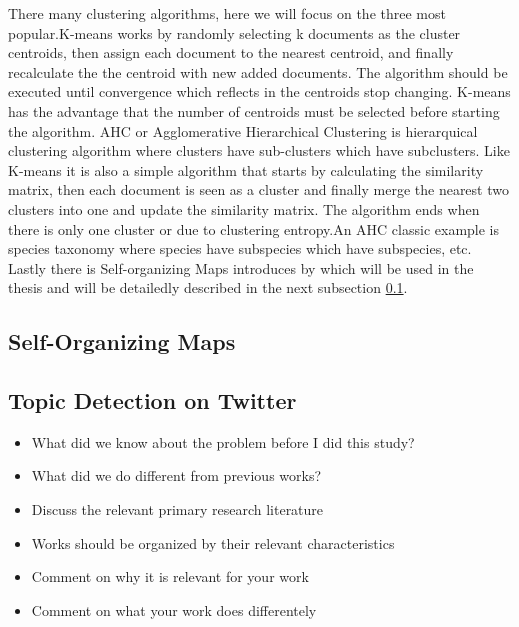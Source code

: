There many clustering algorithms, here we will focus on the three most popular.K-means works by randomly selecting k documents as the cluster centroids, then assign each document to the nearest centroid, and finally recalculate the the centroid with new added documents. The algorithm should be executed until convergence which reflects in the centroids stop changing. K-means has the advantage that the number of centroids must be selected before starting the algorithm.
AHC or Agglomerative Hierarchical Clustering is hierarquical clustering algorithm where clusters have sub-clusters which have subclusters. Like K-means it is also a simple algorithm that starts by calculating the similarity matrix, then each document is seen as a cluster and finally merge the nearest two clusters into one and update the similarity matrix. The algorithm ends when there is only one cluster or due to clustering entropy.An AHC classic example is species taxonomy where species have subspecies which have subspecies, etc.
Lastly there is Self-organizing Maps introduces by \citep{Kohonen1990} which will be used in the thesis and will be detailedly described in the next subsection \ref{sub:self_organizing_maps}.


\subsection{Self-Organizing Maps} %
\label{sub:self_organizing_maps}


\subsection{Topic Detection on Twitter} %
\label{sub:topic_detection_on_twitter}


\begin{itemize}
  \item What did we know about the problem before I did this study? 
  \item What did we do different from previous works? 
  \item Discuss the relevant primary research literature 
  \item Works should be organized by their relevant characteristics 
  \item Comment on why it is relevant for your work 
  \item Comment on what your work does differentely 
\end{itemize}